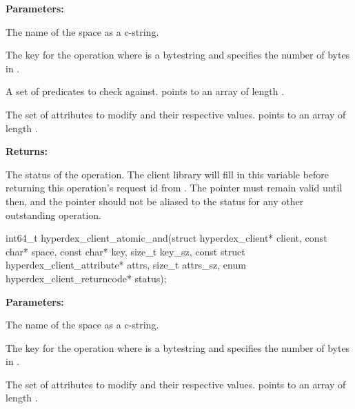 \noindent\textbf{Parameters:}
\begin{description}[labelindent=\widthof{{\code{checks}, \code{checks\_sz}}},leftmargin=*,noitemsep,nolistsep,align=right]
\item[\code{space}] The name of the space as a c-string.
\item[\code{key}, \code{key\_sz}] The key for the operation where  is a bytestring and  specifies the number of bytes in .
\item[\code{checks}, \code{checks\_sz}] A set of predicates to check against.   points to an array of length .
\item[\code{attrs}, \code{attrs\_sz}] The set of attributes to modify and their respective values.   points to an array of length .
\end{description}

\noindent\textbf{Returns:}
\begin{description}[labelindent=\widthof{{\code{status}}},leftmargin=*,noitemsep,nolistsep,align=right]
\item[\code{status}] The status of the operation.  The client library will fill in this variable before returning this operation's request id from .  The pointer must remain valid until then, and the pointer should not be aliased to the status for any other outstanding operation.
\end{description}

\funcsep
{}
\begin{ccode}
int64_t hyperdex_client_atomic_and(struct hyperdex_client* client,
                const char* space,
                const char* key, size_t key_sz,
                const struct hyperdex_client_attribute* attrs, size_t attrs_sz,
                enum hyperdex_client_returncode* status);
\end{ccode}
\funcdesc 

\noindent\textbf{Parameters:}
\begin{description}[labelindent=\widthof{{\code{attrs}, \code{attrs\_sz}}},leftmargin=*,noitemsep,nolistsep,align=right]
\item[\code{space}] The name of the space as a c-string.
\item[\code{key}, \code{key\_sz}] The key for the operation where  is a bytestring and  specifies the number of bytes in .
\item[\code{attrs}, \code{attrs\_sz}] The set of attributes to modify and their respective values.   points to an array of length .
\end{description}

